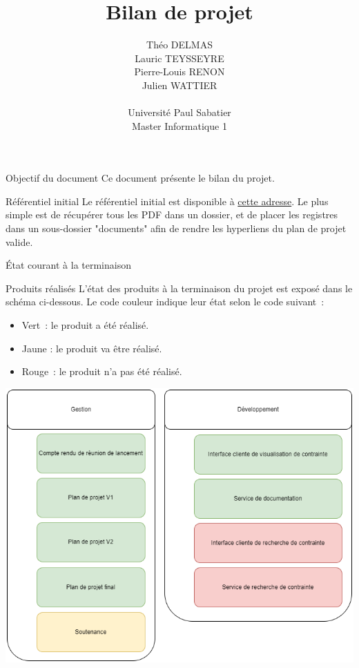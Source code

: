 \documentclass[]{article}
\title{Bilan de projet}
\author{
    Théo DELMAS\\
    Lauric TEYSSEYRE\\
    Pierre-Louis RENON\\
    Julien WATTIER\\
    \\
    Université Paul Sabatier\\
    Master Informatique 1\\
   }
\begin{document}
\maketitle
\newpage
\tableofcontents
\newpage

\begin{section}{Objectif du document}
 Ce document présente le bilan du projet.
\end{section}

{
\setlength{\parindent}{0pt} %
\begin{section}{Référentiel initial}
 Le référentiel initial est disponible à \href{https://github.com/Szyckaa/UE-PROJET-DOCS-GESTION/releases/tag/2.0.0}{cette adresse}.
 Le plus simple est de récupérer tous les PDF dans un dossier, et de placer les registres dans un sous-dossier "documents" afin de rendre les hyperliens du plan de projet valide.
\end{section}

\begin{section}{État courant à la terminaison}
 \begin{subsection}{Produits réalisés}
     L’état des produits à la terminaison du projet est exposé dans le schéma ci-dessous. Le code couleur indique leur état selon le code suivant :

     \begin{itemize}
         \item Vert : le produit a été réalisé.
         \item Jaune : le produit va être réalisé.
         \item Rouge : le produit n’a pas été réalisé.
     \end{itemize}

     \includegraphics[scale=0.49]{IMG/PBS_final}


\end{subsection}
\end{section}}
\end{document}
